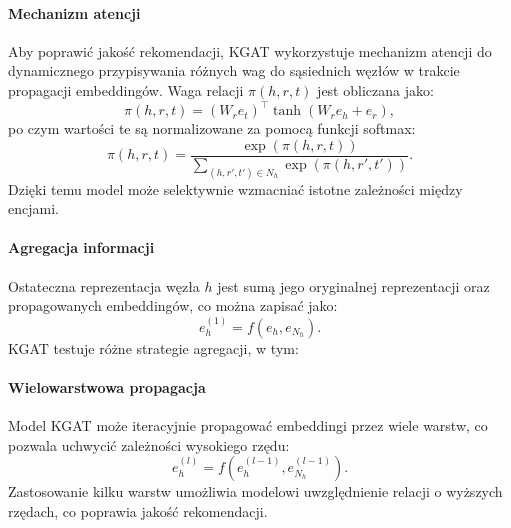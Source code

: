 \documentclass[a4paper,onecolumn]{LTJournalArticle}
\begin{document}
\paragraph{Mechanizm atencji} Aby poprawić jakość rekomendacji, KGAT wykorzystuje mechanizm atencji do dynamicznego przypisywania różnych wag do sąsiednich węzłów w trakcie propagacji embeddingów. Waga relacji \( \pi(h, r, t) \) jest obliczana jako:
\begin{equation}
    \pi(h, r, t) = (W_r e_t)^\top \tanh(W_r e_h + e_r),
\end{equation}
po czym wartości te są normalizowane za pomocą funkcji softmax:
\begin{equation}
    \pi(h, r, t) = \frac{\exp(\pi(h, r, t))}{\sum_{(h,r',t') \in N_h} \exp(\pi(h, r', t'))}.
\end{equation}
Dzięki temu model może selektywnie wzmacniać istotne zależności między encjami.

\paragraph{Agregacja informacji} Ostateczna reprezentacja węzła \( h \) jest sumą jego oryginalnej reprezentacji oraz propagowanych embeddingów, co można zapisać jako:
\begin{equation}
    e_h^{(1)} = f(e_h, e_{N_h}).
\end{equation}
KGAT testuje różne strategie agregacji, w tym:

\paragraph{Wielowarstwowa propagacja} Model KGAT może iteracyjnie propagować embeddingi przez wiele warstw, co pozwala uchwycić zależności wysokiego rzędu:
\begin{equation}
    e_h^{(l)} = f(e_h^{(l-1)}, e_{N_h}^{(l-1)}).
\end{equation}
Zastosowanie kilku warstw umożliwia modelowi uwzględnienie relacji o wyższych rzędach, co poprawia jakość rekomendacji.
\end{document}
